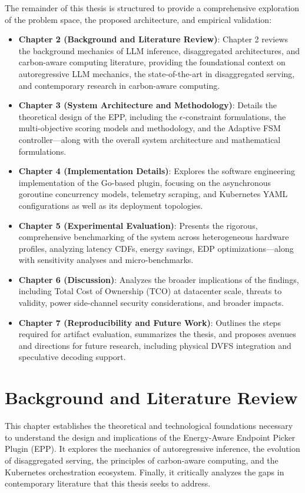 \documentclass[12pt,a4paper,oneside]{report}
\begin{document}
The remainder of this thesis is structured to provide a comprehensive exploration of the problem space, the proposed architecture, and empirical validation:
\begin{itemize}
    \item \textbf{Chapter 2 (Background and Literature Review)}: Chapter 2 reviews the background
mechanics of LLM inference, disaggregated architectures, and carbon-aware computing
literature, providing the foundational context on autoregressive LLM mechanics, the state-of-the-art in disaggregated serving, and contemporary research in carbon-aware computing.
    \item \textbf{Chapter 3 (System Architecture and Methodology)}: Details the theoretical design of the EPP, including the \(\epsilon\)-constraint formulations, the multi-objective scoring models and methodology, and the Adaptive FSM controller—along with the overall system architecture and mathematical formulations.
    \item \textbf{Chapter 4 (Implementation Details)}: Explores the software engineering implementation of the Go-based plugin, focusing on the asynchronous goroutine concurrency models, telemetry scraping, and Kubernetes YAML configurations as well as its deployment topologies.
    \item \textbf{Chapter 5 (Experimental Evaluation)}: Presents the rigorous, comprehensive benchmarking of the system across heterogeneous hardware profiles, analyzing latency CDFs, energy savings, EDP optimizations—along with sensitivity analyses and micro-benchmarks.
    \item \textbf{Chapter 6 (Discussion)}: Analyzes the broader implications of the findings, including Total Cost of Ownership (TCO) at datacenter scale, threats to validity, power side-channel security considerations, and broader impacts.
    \item \textbf{Chapter 7 (Reproducibility and Future Work)}: Outlines the steps required for artifact evaluation, summarizes the thesis, and proposes avenues and directions for future research, including physical DVFS integration and speculative decoding support.
\end{itemize}


\chapter{Background and Literature Review}
\label{ch:literature_review}

This chapter establishes the theoretical and technological foundations necessary to understand the design and implications of the Energy-Aware Endpoint Picker Plugin (EPP). It explores the mechanics of autoregressive inference, the evolution of disaggregated serving, the principles of carbon-aware computing, and the Kubernetes orchestration ecosystem. Finally, it critically analyzes the gaps in contemporary literature that this thesis seeks to address.
\end{document}
